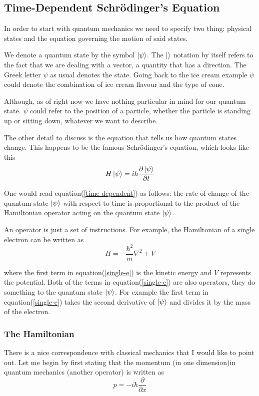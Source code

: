 \documentclass[a4paper]{article}
\begin{document}
\subsection{Time-Dependent Schr\"odinger's Equation}
In order to start with quantum mechanics we need to specify two thing: physical states and the equation governing the motion of said states.

We denote a quantum state by the symbol $\ket{\psi}$. 
The $\ket{  }$ notation by itself refers to the fact that we are dealing with a vector, a quantity that has a direction. 
The Greek letter $\psi$ as usual denotes the state. 
Going back to the ice cream example $\psi$ could denote the combination of ice cream flavour and the type of cone.

Although, as of right now we have nothing particular in mind for our quantum state. $\psi$ could refer to the position of a particle, whether the particle is standing up or sitting down, whatever we want to describe.

The other detail to discuss is the equation that tells us how quantum states change.
This happens to be the famous Schr\"odinger's equation, which looks like this
\begin{equation}\label{time-dependent}
H\ket{\psi} = i\hbar \frac{\partial \ket{\psi}}{\partial t}
\end{equation} 

One would read equation(\ref{time-dependent}) as follows: the rate of change of the quantum state $\ket{\psi}$ with respect to time is proportional to the product of the Hamiltonian operator acting on the quantum state $\ket{\psi}$.

An operator is just a set of instructions.
For example, the Hamiltonian of a single electron can be written as
\begin{equation} \label{single-e}
H = - \frac{\hbar^2}{m} \nabla^2 + V
\end{equation}

where the first term in equation(\ref{single-e}) is the kinetic energy and $V$ represents the potential.
Both of the terms in equation(\ref{single-e}) are also operators, they do something to the quantum state $\ket{\psi}$.
For example the first term in equation(\ref{single-e}) takes the second derivative of $\ket{\psi}$ and divides it by the mass of the electron.

\subsubsection{The Hamiltonian}
There is a nice correspondence with classical mechanics that I would like to point out.
Let me begin by first stating that the momentum (in one dimension)in quantum mechanics (another operator) is written as
$$
p = -i\hbar \frac{\partial}{\partial x}
$$
\end{document}
